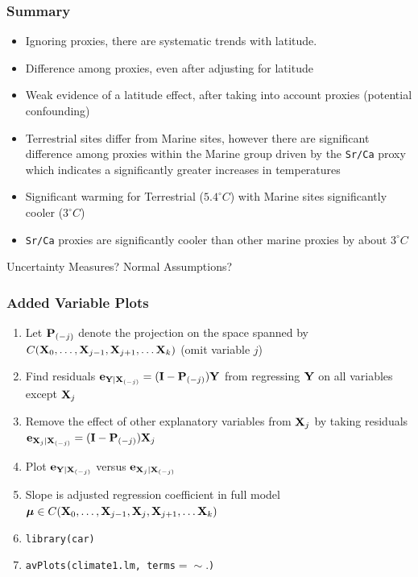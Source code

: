 \documentclass[handout]{beamer}
\begin{document}
\begin{frame}
  \frametitle{Summary}
  \begin{itemize}
   \item Ignoring proxies, there are systematic trends with
     latitude. \pause
  \item Difference among proxies, even after adjusting for latitude \pause
\item Weak evidence of a latitude effect, after taking into account
  proxies (potential confounding)
\pause
 \item  Terrestrial sites differ from Marine sites, however there are significant difference among
      proxies within the Marine group  driven by the {\tt Sr/Ca} proxy which
      indicates a significantly greater increases in temperatures
\pause
   \item Significant warming for Terrestrial ($5.4 ^\circ C$) with
     Marine  sites   significantly  cooler ($3^ \circ  C$)\pause
   \item {\tt Sr/Ca} proxies are significantly cooler than other
     marine proxies by about $3^\circ C$ \pause
  \end{itemize}

Uncertainty Measures?  \pause  Normal Assumptions?
\end{frame}

\begin{frame}
  \frametitle{Added Variable Plots}
  \begin{enumerate}
  \item   Let $\P_{(-j)}$ denote the projection on the space spanned by
   $C(\X_0, \ldots, \X_{j-1}, \X_{j+1}, \ldots \X_k)$  (omit variable
    $j$) \pause
\item  Find residuals $\e_{\Y \mid \X_{(-j)}} = (\I - \P_{(-j)})\Y$
  from regressing $\Y$ on  all variables except $\X_j$ \pause
\item  Remove the effect of other explanatory variables from $\X_j$ by
  taking residuals $ \e_{\X_j \mid \X_{(-j)}} = (\I - \P_{(-j)})\X_j$ \pause
\item Plot $\e_{\Y \mid \X_{(-j)}}$ versus $\e_{\X_j \mid \X_{(-j)}}$ \pause
\item Slope is adjusted regression coefficient in full model $\mub \in
  C(\X_0, \ldots, \X_{j-1}, \X_j, \X_{j+1}, \ldots \X_k)$ \pause
\item {\tt library(car)} \pause
\item {\tt avPlots(climate1.lm, terms$=\sim .$)}
  \end{enumerate}
 \end{frame}
\end{document}
